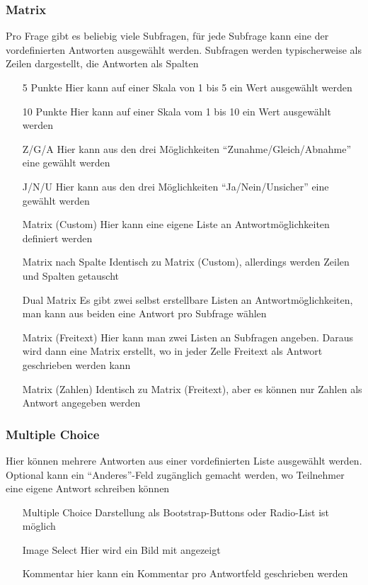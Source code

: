 \subsubsection{Matrix}

Pro Frage gibt es beliebig viele Subfragen, für jede Subfrage kann eine der vordefinierten Antworten ausgewählt werden.
Subfragen werden typischerweise als Zeilen dargestellt, die Antworten als Spalten

\begin{itemize}
	\item[5 Punkte] Hier kann auf einer Skala von 1 bis 5 ein Wert ausgewählt werden
	\item[10 Punkte] Hier kann auf einer Skala vom 1 bis 10 ein Wert ausgewählt werden
	\item[Z/G/A] Hier kann aus den drei Möglichkeiten \enquote{Zunahme/Gleich/Abnahme} eine gewählt werden
	\item[J/N/U] Hier kann aus den drei Möglichkeiten \enquote{Ja/Nein/Unsicher} eine gewählt werden
	\item[Matrix (Custom)] Hier kann eine eigene Liste an Antwortmöglichkeiten definiert werden
	\item[Matrix nach Spalte] Identisch zu Matrix (Custom), allerdings werden Zeilen und Spalten getauscht
	\item[Dual Matrix] Es gibt zwei selbst erstellbare Listen an Antwortmöglichkeiten, man kann aus beiden eine Antwort pro Subfrage wählen
	\item[Matrix (Freitext)] Hier kann man zwei Listen an Subfragen angeben. Daraus wird dann eine Matrix erstellt, wo in jeder Zelle Freitext als Antwort geschrieben werden kann
	\item[Matrix (Zahlen)] Identisch zu Matrix (Freitext), aber es können nur Zahlen als Antwort angegeben werden
\end{itemize}

\subsubsection{Multiple Choice}

Hier können mehrere Antworten aus einer vordefinierten Liste ausgewählt werden.
Optional kann ein \enquote{Anderes}-Feld zugänglich gemacht werden, wo Teilnehmer eine eigene Antwort schreiben können

\begin{itemize}
	\item[Multiple Choice] Darstellung als Bootstrap-Buttons oder Radio-List ist möglich
	\item[Image Select] Hier wird ein Bild mit angezeigt
	\item[Kommentar] hier kann ein Kommentar pro Antwortfeld geschrieben werden
\end{itemize}

